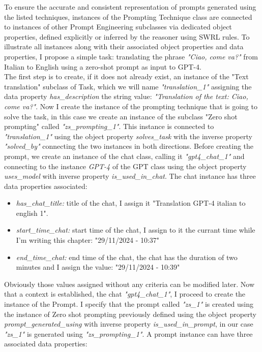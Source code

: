 To ensure the accurate and consistent representation of prompts generated using the listed techniques, instances of the Prompting Technique class are connected to instances of other Prompt Engineering subclasses via dedicated object properties, defined explicitly or inferred by the reasoner using SWRL rules. To illustrate all instances along with their associated object properties and data properties, I propose a simple task: translating the phrase \textit{"Ciao, come va?"} from Italian to English using a zero-shot prompt as input to GPT-4.\\
The first step is to create, if it does not already exist, an instance of the "Text translation" subclass of Task, which we will name \textit{"translation\_1"} assigning the data property \textit{has\_description} the string value: \textit{"Translation of the text: Ciao, come va?"}. Now I create the instance of the prompting technique that is going to solve the task, in this case we create an instance of the subclass "Zero shot prompting" called \textit{"zs\_prompting\_1"}. This instance is connected to \textit{"translation\_1"} using the object property \textit{solves\_task} with the inverse property \textit{"solved\_by"} connecting the two instances in both directions. Before creating the prompt, we create an instance of the chat class, calling it \textit{"gpt4\_chat\_1"} and connecting to the instance \textit{GPT-4} of the GPT class using the object property \textit{uses\_model} with inverse property \textit{is\_used\_in\_chat}. The chat instance has three data properties associated:
\begin{itemize}
    \item \textit{has\_chat\_title:} title of the chat, I assign it "Translation GPT-4 italian to english 1".

    \item \textit{start\_time\_chat:} start time of the chat, I assign to it the currant time while I'm writing this chapter: "29/11/2024 - 10:37"

    \item \textit{end\_time\_chat:} end time of the chat, the chat has the duration of two minutes and I assign the value: "29/11/2024 - 10:39"
\end{itemize}
Obviously those values assigned without any criteria can be modified later. Now that a context is established, the chat \textit{"gpt4\_chat\_1"}, I proceed to create the instance of the Prompt. I specify that the prompt called \textit{"zs\_1"} is created using the instance of Zero shot prompting previously defined using the object property \textit{prompt\_generated\_using} with inverse property \textit{is\_used\_in\_prompt}, in our case \textit{"zs\_1"} is generated using \textit{"zs\_prompting\_1"}. A prompt instance can have three associated data properties:
